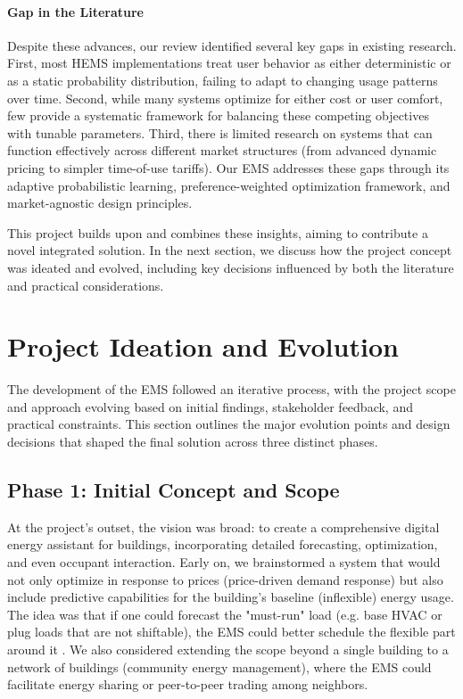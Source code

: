 \documentclass[12pt,a4paper]{article}
\begin{document}
\paragraph{Gap in the Literature} Despite these advances, our review identified several key gaps in existing research. First, most HEMS implementations treat user behavior as either deterministic or as a static probability distribution, failing to adapt to changing usage patterns over time. Second, while many systems optimize for either cost or user comfort, few provide a systematic framework for balancing these competing objectives with tunable parameters. Third, there is limited research on systems that can function effectively across different market structures (from advanced dynamic pricing to simpler time-of-use tariffs). Our EMS addresses these gaps through its adaptive probabilistic learning, preference-weighted optimization framework, and market-agnostic design principles.

This project builds upon and combines these insights, aiming to contribute a novel integrated solution. In the next section, we discuss how the project concept was ideated and evolved, including key decisions influenced by both the literature and practical considerations.

\clearpage

\section{Project Ideation and Evolution}
The development of the EMS followed an iterative process, with the project scope and approach evolving based on initial findings, stakeholder feedback, and practical constraints. This section outlines the major evolution points and design decisions that shaped the final solution across three distinct phases.

\subsection{Phase 1: Initial Concept and Scope}
At the project’s outset, the vision was broad: to create a comprehensive digital energy assistant for buildings, incorporating detailed forecasting, optimization, and even occupant interaction. Early on, we brainstormed a system that would not only optimize in response to prices (price-driven demand response) but also include predictive capabilities for the building’s baseline (inflexible) energy usage. The idea was that if one could forecast the "must-run" load (e.g. base HVAC or plug loads that are not shiftable), the EMS could better schedule the flexible part around it \cite{Mahmoudi2020, AlSorour2022}. We also considered extending the scope beyond a single building to a network of buildings (community energy management), where the EMS could facilitate energy sharing or peer-to-peer trading among neighbors.
\end{document}
